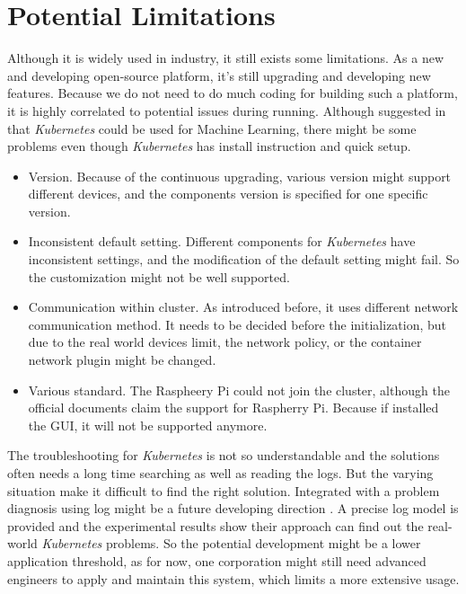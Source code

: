 \documentclass[conference, a4paper]{IEEEtran_ID}
\begin{document}
\section{Potential Limitations}
Although it is widely used in industry, it still exists some limitations. As a new and developing open-source platform, it's still upgrading and developing new features. Because we do not need to do much coding for building such a platform, it is highly correlated to potential issues during running. Although suggested in \cite{8486422} that \textit{Kubernetes} could be used for Machine Learning, there might be some problems even though \textit{Kubernetes} has install instruction and quick setup.
\begin{itemize}
    \item Version. Because of the continuous upgrading, various version might support different devices, and the components version is specified for one specific version.
    \item Inconsistent default setting. Different components for \textit{Kubernetes} have inconsistent settings, and the modification of the default setting might fail. So the customization might not be well supported.
    \item Communication within cluster. As introduced before, it uses different network communication method. It needs to be decided before the initialization, but due to the real world devices limit, the network policy, or the container network plugin might be changed.
    \item Various standard.  The Raspheery Pi could not join the cluster, although the official documents claim the support for Raspherry Pi. Because if installed the GUI, it will not be supported anymore. 
\end{itemize}

The troubleshooting for \textit{Kubernetes} is not so understandable and the solutions often needs a long time searching as well as reading the logs. But the varying situation make it difficult to find the right solution. Integrated with a problem diagnosis using log might be a future developing direction \cite{8119164}. A precise log model is provided and the experimental results show their approach can find out the real-world \textit{Kubernetes} problems. So the potential development might be a lower application threshold, as for now, one corporation might still need advanced engineers to apply and maintain this system, which limits a more extensive usage. 



\end{document}
